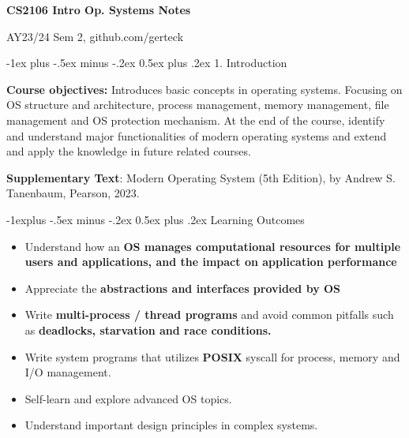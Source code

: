\documentclass[10pt, landscape]{article}
\makeatletter
\renewcommand{\section}{\@startsection{section}{1}{0mm}%
                                {-1ex plus -.5ex minus -.2ex}%
                                {0.5ex plus .2ex}%
                                {\normalfont\large\bfseries}}
\renewcommand{\subsection}{\@startsection{subsection}{2}{0mm}%
                                {-1explus -.5ex minus -.2ex}%
                                {0.5ex plus .2ex}%
                                {\normalfont\normalsize\bfseries}}
\makeatother
\begin{document}
\raggedright
\footnotesize
\begin{multicols*}{3}

\setlength{\premulticols}{1pt}
\setlength{\postmulticols}{1pt}
\setlength{\multicolsep}{1pt}
\setlength{\columnsep}{2pt}

\begin{center}
     \Large{\textbf{CS2106 Intro Op. Systems Notes}} \\
\end{center}
AY23/24 Sem 2, github.com/gerteck


\section{1. Introduction}

\textbf{Course objectives:} Introduces basic concepts in operating systems. Focusing on OS structure and architecture, process management, memory management, file management and OS protection mechanism. At the end of the course, identify and understand major functionalities of modern operating systems and extend and apply the knowledge in future related courses.

\textbf{Supplementary Text}: Modern Operating System (5th Edition), by Andrew S. Tanenbaum, Pearson, 2023.

\subsection{Learning Outcomes}
\begin{itemize}
	\item Understand how an \textbf{OS manages computational resources for multiple users and applications, and the impact on application performance}
	\item Appreciate the \textbf{abstractions and interfaces provided by OS}
	\item Write \textbf{multi-process / thread programs} and avoid common pitfalls such as \textbf{deadlocks, starvation and race conditions.}
	\item Write system programs that utilizes \textbf{POSIX} syscall for process, memory and I/O management.
	\item Self-learn and explore advanced OS topics.
	\item Understand important design principles in complex systems.
\end{itemize}


\end{multicols*}
\end{document}
